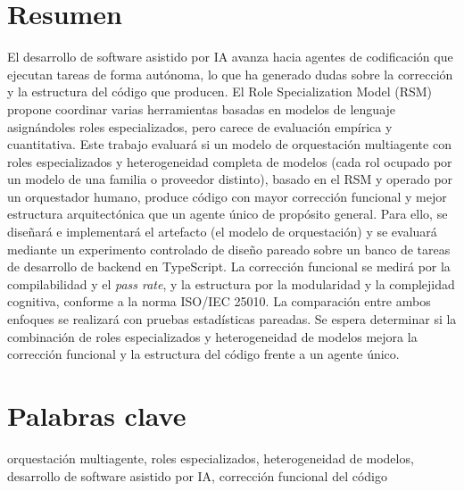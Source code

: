 \section*{Resumen}
El desarrollo de software asistido por IA avanza hacia agentes de codificación que ejecutan tareas de forma autónoma, lo que ha generado dudas sobre la corrección y la estructura del código que producen. El Role Specialization Model (RSM) propone coordinar varias herramientas basadas en modelos de lenguaje asignándoles roles especializados, pero carece de evaluación empírica y cuantitativa. Este trabajo evaluará si un modelo de orquestación multiagente con roles especializados y heterogeneidad completa de modelos (cada rol ocupado por un modelo de una familia o proveedor distinto), basado en el RSM y operado por un orquestador humano, produce código con mayor corrección funcional y mejor estructura arquitectónica que un agente único de propósito general. Para ello, se diseñará e implementará el artefacto (el modelo de orquestación) y se evaluará mediante un experimento controlado de diseño pareado sobre un banco de tareas de desarrollo de backend en TypeScript. La corrección funcional se medirá por la compilabilidad y el \textit{pass rate}, y la estructura por la modularidad y la complejidad cognitiva, conforme a la norma ISO/IEC 25010. La comparación entre ambos enfoques se realizará con pruebas estadísticas pareadas. Se espera determinar si la combinación de roles especializados y heterogeneidad de modelos mejora la corrección funcional y la estructura del código frente a un agente único.

\section*{Palabras clave}
orquestación multiagente, roles especializados, heterogeneidad de modelos, desarrollo de software asistido por IA, corrección funcional del código

\newpage
